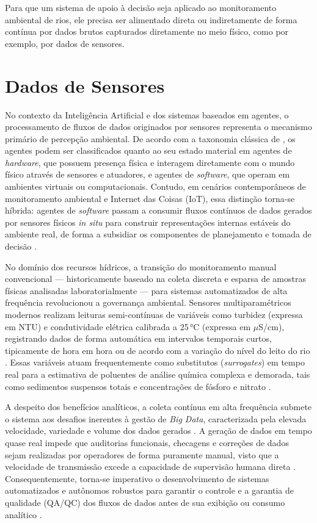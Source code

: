 Para que um sistema de apoio à decisão seja aplicado ao monitoramento ambiental de rios, ele precisa ser alimentado direta ou indiretamente de forma contínua por dados brutos capturados diretamente no meio físico, como por exemplo, por dados de sensores.

\section{Dados de Sensores}
\label{sec:dados_sensores}

No contexto da Inteligência Artificial e dos sistemas baseados em agentes, o processamento de fluxos de dados originados por sensores representa o mecanismo primário de percepção ambiental. De acordo com a taxonomia clássica de , os agentes podem ser classificados quanto ao seu estado material em agentes de \textit{hardware}, que possuem presença física e interagem diretamente com o mundo físico através de sensores e atuadores, e agentes de \textit{software}, que operam em ambientes virtuais ou computacionais. Contudo, em cenários contemporâneos de monitoramento ambiental e Internet das Coisas (IoT), essa distinção torna-se híbrida: agentes de \textit{software} passam a consumir fluxos contínuos de dados gerados por sensores físicos \textit{in situ} para construir representações internas estáveis do ambiente real, de forma a subsidiar os componentes de planejamento e tomada de decisão \cite{cheng2026, muller1999}.

No domínio dos recursos hídricos, a transição do monitoramento manual convencional --- historicamente baseado na coleta discreta e esparsa de amostras físicas analisadas laboratorialmente \cite{leigh2019framework} --- para sistemas automatizados de alta frequência revolucionou a governança ambiental. Sensores multiparamétricos modernos realizam leituras semi-contínuas de variáveis como turbidez (expressa em NTU) e condutividade elétrica calibrada a 25\,°C (expressa em $\mu$S/cm), registrando dados de forma automática em intervalos temporais curtos, tipicamente de hora em hora ou de acordo com a variação do nível do leito do rio \cite{leigh2019framework}. Essas variáveis atuam frequentemente como substitutos (\textit{surrogates}) em tempo real para a estimativa de poluentes de análise química complexa e demorada, tais como sedimentos suspensos totais e concentrações de fósforo e nitrato \cite{leigh2019framework}.

A despeito dos benefícios analíticos, a coleta contínua em alta frequência submete o sistema aos desafios inerentes à gestão de \textit{Big Data}, caracterizada pela elevada velocidade, variedade e volume dos dados gerados \cite{leigh2019framework}. A geração de dados em tempo quase real impede que auditorias funcionais, checagens e correções de dados sejam realizadas por operadores de forma puramente manual, visto que a velocidade de transmissão excede a capacidade de supervisão humana direta \cite{leigh2019framework}. Consequentemente, torna-se imperativo o desenvolvimento de sistemas automatizados e autônomos robustos para garantir o controle e a garantia de qualidade (QA/QC) dos fluxos de dados antes de sua exibição ou consumo analítico \cite{leigh2019framework}.

